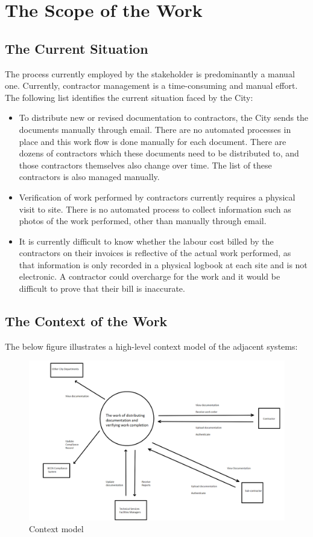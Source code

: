 \documentclass[12pt]{article}
\begin{document}
\section{The Scope of the Work}
\subsection{The Current Situation}
The process currently employed by the stakeholder is predominantly a manual one.
Currently, contractor management is a time-consuming and manual effort. The 
following list identifies the current situation faced by the City:
\begin{itemize}
\item To distribute new or revised documentation to contractors, the City sends 
the documents manually through email. There are no automated processes in place
and this work flow is done manually for each document. There are dozens of
contractors which these documents need to be distributed to, and those
contractors themselves also change over time. The list of these contractors is
also managed manually.

\item Verification of work performed by contractors currently requires
a physical visit to site. There is no automated process to collect information 
such as photos of the work performed, other than manually through email.
\item It is currently difficult to know whether the labour cost
billed by the contractors on their invoices is reflective of the actual work
performed, as that information is only recorded in a physical logbook at each
site and is not electronic. A contractor could overcharge for the work and it
would be difficult to prove that their bill is inaccurate.

\end{itemize}

\subsection{The Context of the Work}
The below figure illustrates a high-level context model of the adjacent systems:
\begin{figure}[h]
\centering
\includegraphics[width=1\textwidth]{4G06A-context-model.png}
\caption{Context model}
\end{figure}
\end{document}
